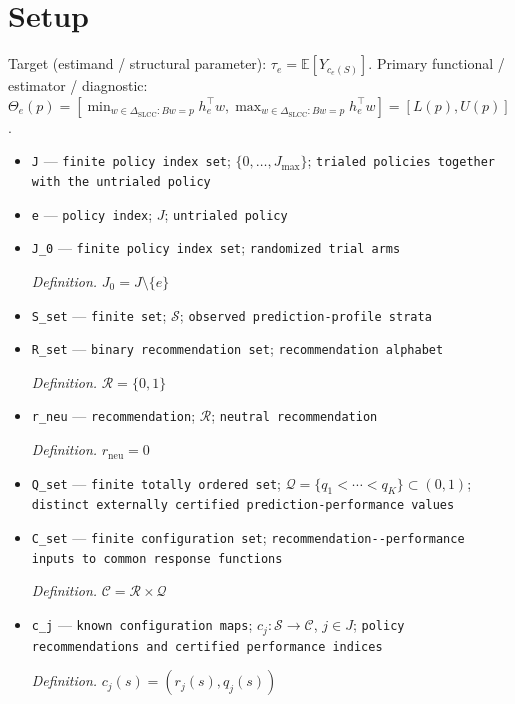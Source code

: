 \documentclass{article}
\begin{document}
\section{Setup}

Target (estimand / structural parameter): \(\tau_e=\mathbb E[Y_{c_e(S)}]\).
Primary functional / estimator / diagnostic: \(\Theta_e(p)=[\min_{w\in\Delta_{\mathrm{SLCC}}:Bw=p}h_e^{\top}w,\max_{w\in\Delta_{\mathrm{SLCC}}:Bw=p}h_e^{\top}w]=[L(p),U(p)]\).
\begin{itemize}
  \item \texttt{J} --- \texttt{finite policy index set}; \(\{0,\ldots,J_{\max}\}\); \texttt{trialed policies together with the untrialed policy}
  \item \texttt{e} --- \texttt{policy index}; \(J\); \texttt{untrialed policy}
  \item \texttt{J\_\allowbreak{}0} --- \texttt{finite policy index set}; \texttt{randomized trial arms}
  \par\smallskip\noindent\emph{Definition.} \(J_{0}=J\setminus\{e\}\)
  \item \texttt{S\_\allowbreak{}set} --- \texttt{finite set}; \(\mathcal S\); \texttt{observed prediction-\allowbreak{}profile strata}
  \item \texttt{R\_\allowbreak{}set} --- \texttt{binary recommendation set}; \texttt{recommendation alphabet}
  \par\smallskip\noindent\emph{Definition.} \(\mathcal R=\{0,1\}\)
  \item \texttt{r\_\allowbreak{}neu} --- \texttt{recommendation}; \(\mathcal R\); \texttt{neutral recommendation}
  \par\smallskip\noindent\emph{Definition.} \(r_{\mathrm{neu}}=0\)
  \item \texttt{Q\_\allowbreak{}set} --- \texttt{finite totally ordered set}; \(\mathcal Q=\{q_{1}<\cdots<q_{K}\}\subset(0,1)\); \texttt{distinct externally certified prediction-\allowbreak{}performance values}
  \item \texttt{C\_\allowbreak{}set} --- \texttt{finite configuration set}; \texttt{recommendation-\allowbreak{}-\allowbreak{}performance inputs to common response functions}
  \par\smallskip\noindent\emph{Definition.} \(\mathcal C=\mathcal R\times\mathcal Q\)
  \item \texttt{c\_\allowbreak{}j} --- \texttt{known configuration maps}; \(c_{j}:\mathcal S\to\mathcal C\), \(j\in J\); \texttt{policy recommendations and certified performance indices}
  \par\smallskip\noindent\emph{Definition.} \(c_{j}(s)=(r_{j}(s),q_{j}(s))\)

\end{itemize}
\end{document}
